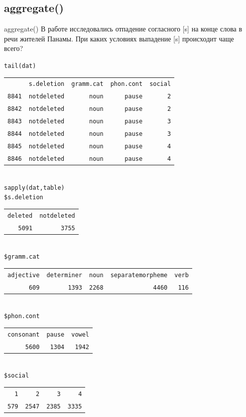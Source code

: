 \subsection{aggregate()}
\begin{frame}{aggregate()}
В работе \citep{cedergren73} исследовались отпадение согласного [s] на конце слова в речи жителей Панамы. При каких условиях выпадение [s] происходит чаще всего?
\scriptsize
\begin{alltt}
\alert{tail(dat)}\\
\begin{tabular}{rrrrr}
 & s.deletion & gramm.cat & phon.cont & social \\
8841 & not deleted & noun & pause & 2 \\
8842 & not deleted & noun & pause & 2 \\
8843 & not deleted & noun & pause & 3 \\
8844 & not deleted & noun & pause & 3 \\
8845 & not deleted & noun & pause & 4 \\ 
8846 & not deleted & noun & pause & 4 \\ 
\end{tabular}
\\
\alert{sapply(dat, table)}\\
\$s.deletion\\
\begin{tabular}{rr}
deleted & not deleted \\
5091 & 3755 \\
\end{tabular}\\
\$gramm.cat\\
\begin{tabular}{rrrrr}
adjective & determiner & noun & separate morpheme & verb \\
609 & 1393 & 2268 & 4460 & 116 \\
\end{tabular}\\
\$phon.cont\\
\begin{tabular}{rrr}
consonant & pause & vowel \\
5600 & 1304 & 1942 \\
\end{tabular}\\
\$social\\
\begin{tabular}{rrrr}
1 & 2 & 3 & 4 \\
579 & 2547 & 2385 & 3335 \\
\end{tabular}
\end{alltt}
\normalsize
\end{frame}
